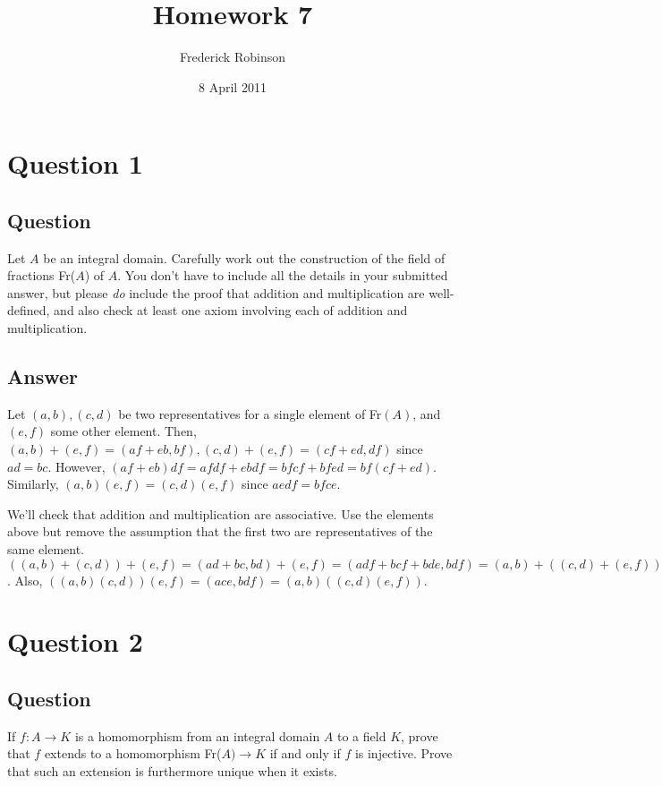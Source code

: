 \documentclass[11pt]{article}
\begin{document}



\title{Homework 7}
\author{Frederick Robinson}
\date{8 April 2011}
\maketitle




\section{Question 1}
\subsection{Question}
Let $A$ be an integral domain. Carefully work out the construction of the field of fractions Fr($A$) of $A$. You don't have to include all the details in your submitted answer, but please \emph{do} include the proof that addition and multiplication are well-defined, and also check at least one axiom involving each of addition and multiplication.
\subsection{Answer}
Let $(a,b), (c,d)$ be two representatives for a single element of Fr$(A)$, and $(e,f)$ some other element. Then, $(a,b)+(e,f) = (af+eb, bf), (c,d)+(e,f) = (cf+ed,df)$ since $ad=bc$. However, $(af+eb)df = afdf+ebdf = bfcf + bfed=bf(cf+ed)$. Similarly, $(a,b)(e,f)=(c,d)(e,f)$ since $aedf=bfce$.

We'll check that addition and multiplication are associative. Use the elements above but remove the assumption that the first two are representatives of the same element.  $((a,b)+(c,d))+(e,f) = (ad+bc,bd)+(e,f) = (adf+bcf+bde,bdf)=(a,b)+((c,d)+(e,f))$. Also, $((a,b)(c,d))(e,f)=(ace,bdf)=(a,b)((c,d)(e,f))$.


\section{Question 2}
\subsection{Question}
If $f: A \to K$ is a homomorphism from an integral domain $A$ to a field $K$, prove that $f$ extends to a homomorphism Fr($A) \to K$ if and only if $f$ is injective. Prove that such an extension is furthermore unique when it exists.
\end{document}
